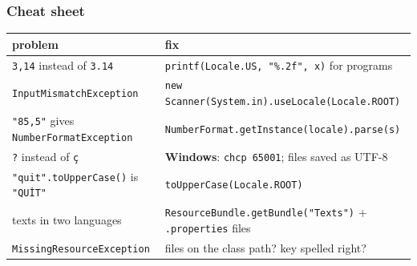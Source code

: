 \documentclass[aspectratio=169,10pt,compress]{beamer}
\newcommand{\win}{\textbf{Windows}}
\begin{document}




\begin{frame}[t,fragile] \frametitle{Cheat sheet}
  \begin{center}\small
  \begin{tabular}{L{0.36\textwidth}L{0.56\textwidth}}
    \toprule
    \textbf{problem} & \textbf{fix} \\
    \midrule
    \texttt{3,14} instead of \texttt{3.14}      & \texttt{printf(Locale.US, "\%.2f", x)} for programs \\
    \texttt{InputMismatchException}             & \texttt{new Scanner(System.in).useLocale(Locale.ROOT)} \\
    \texttt{"85,5"} gives \texttt{NumberFormatException} & \texttt{NumberFormat.getInstance(locale).parse(s)} \\
    \texttt{?} instead of \texttt{ç}            & \win: \texttt{chcp 65001}; files saved as UTF-8 \\
    \texttt{"quit".toUpperCase()} is \texttt{"QUİT"} & \texttt{toUpperCase(Locale.ROOT)} \\
    texts in two languages                      & \texttt{ResourceBundle.getBundle("Texts")} + \texttt{.properties} files \\
    \texttt{MissingResourceException}           & files on the class path? key spelled right? \\
    \bottomrule
  \end{tabular}
  \end{center}
\end{frame}
\end{document}
